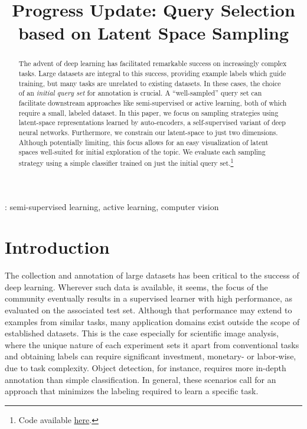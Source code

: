 \documentclass[a4paper]{article}
\title{Progress Update: Query Selection based on Latent Space Sampling}
\begin{document}
\maketitle

\begin{abstract}
  The advent of deep learning has facilitated remarkable success on increasingly
  complex tasks. Large datasets are integral to this success, providing example
  labels which guide training, but many tasks are unrelated to existing
  datasets. In these cases, the choice of an \emph{initial query set} for
  annotation is crucial. A ``well-sampled'' query set can facilitate downstream
  approaches like semi-supervised or active learning, both of which require a
  small, labeled dataset. In this paper, we focus on sampling strategies using
  latent-space representations learned by auto-encoders, a self-supervised
  variant of deep neural networks. Furthermore, we constrain our latent-space to
  just two dimensions. Although potentially limiting, this focus allows for an
  easy visualization of latent spaces well-suited for initial exploration of the
  topic. We evaluate each sampling strategy using a simple classifier trained on
  just the initial query set.\footnote{Code available
    \href{https://github.com/bendkill/latens}{here}.}
\end{abstract}
: semi-supervised learning, active learning, computer
vision

\section{Introduction}
\label{sec:introduction}

The collection and annotation of large datasets has been critical to the success
of deep learning. Wherever such data is available, it seems, the focus of the
community eventually results in a supervised learner with high performance, as
evaluated on the associated test set. Although that performance may extend to
examples from similar tasks, many application domains exist outside the scope of
established datasets. This is the case especially for scientific image analysis,
where the unique nature of each experiment sets it apart from conventional tasks
and obtaining labels can require significant investment, monetary- or
labor-wise, due to task complexity. Object detection, for instance, requires
more in-depth annotation than simple classification. In general, these scenarios
call for an approach that minimizes the labeling required to learn a specific
task.
\end{document}
